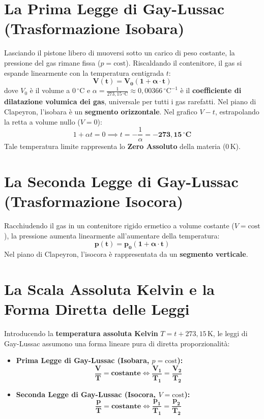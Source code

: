 \documentclass[11pt,a4paper,oneside]{report}
\begin{document}
\section{La Prima Legge di Gay-Lussac (Trasformazione Isobara)}

Lasciando il pistone libero di muoversi sotto un carico di peso costante, la pressione del gas rimane fissa ($p = \text{cost}$). Riscaldando il contenitore, il gas si espande linearmente con la temperatura centigrada $t$:
\[
\mathbf{V(t) = V_0 (1 + \alpha \cdot t)}
\]
dove $V_0$ \`e il volume a $0\,^\circ\text{C}$ e $\alpha = \frac{1}{273{,}15\,^\circ\text{C}} \approx 0{,}00366\,^\circ\text{C}^{-1}$ \`e il \textbf{coefficiente di dilatazione volumica dei gas}, universale per tutti i gas rarefatti.
Nel piano di Clapeyron, l'isobara \`e un \textbf{segmento orizzontale}.
Nel grafico $V - t$, estrapolando la retta a volume nullo ($V = 0$):
\[
1 + \alpha t = 0 \implies t = -\frac{1}{\alpha} = \mathbf{-273{,}15\,^\circ\text{C}}
\]
Tale temperatura limite rappresenta lo \textbf{Zero Assoluto} della materia ($0\,\text{K}$).

\section{La Seconda Legge di Gay-Lussac (Trasformazione Isocora)}

Racchiudendo il gas in un contenitore rigido ermetico a volume costante ($V = \text{cost}$), la pressione aumenta linearmente all'aumentare della temperatura:
\[
\mathbf{p(t) = p_0 (1 + \alpha \cdot t)}
\]
Nel piano di Clapeyron, l'isocora \`e rappresentata da un \textbf{segmento verticale}.

\section{La Scala Assoluta Kelvin e la Forma Diretta delle Leggi}

Introducendo la \textbf{temperatura assoluta Kelvin} $T = t + 273{,}15\,\text{K}$, le leggi di Gay-Lussac assumono una forma lineare pura di diretta proporzionalit\`a:
\begin{itemize}
  \item \textbf{Prima Legge di Gay-Lussac (Isobara, $p = \text{cost}$):}
  \[
  \mathbf{\frac{V}{T} = \text{costante}} \iff \mathbf{\frac{V_1}{T_1} = \frac{V_2}{T_2}}
  \]
  \item \textbf{Seconda Legge di Gay-Lussac (Isocora, $V = \text{cost}$):}
  \[
  \mathbf{\frac{p}{T} = \text{costante}} \iff \mathbf{\frac{p_1}{T_1} = \frac{p_2}{T_2}}
  \]
\end{itemize}
\end{document}
